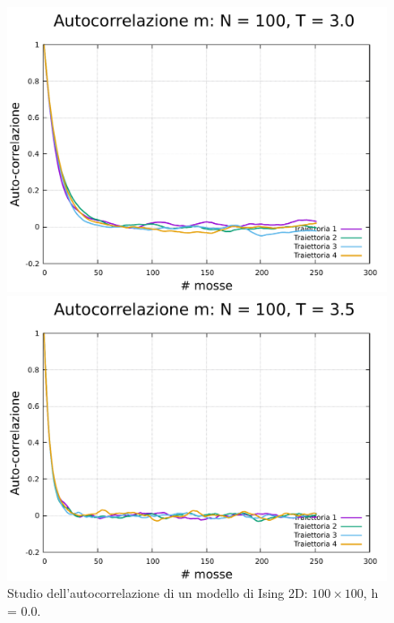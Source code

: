 \begin{figure}[H]
    \begin{minipage}{0.45\textwidth}  
      \centering
      \includegraphics[page=1, width=\textwidth]{Immagini/simIsing2D/metro/tcorr/auto_100_3.0.pdf}
      \caption{$T\,=\,3.0$}
    \end{minipage}\hfill
    \begin{minipage}{0.45\textwidth}  
      \centering
      \includegraphics[page=1, width=\textwidth]{Immagini/simIsing2D/metro/tcorr/auto_100_3.5.pdf}
      \caption{$T\,=\,3.5$}
    \end{minipage}
    \caption{Studio dell'autocorrelazione di un modello di Ising 2D: $100 \times 100$, h = 0.0.}
\end{figure}

